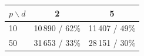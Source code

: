 \begin{tabular}{lcc}
\toprule
$p\backslash d$ & 2 & 5 \\
\midrule
10 & 10\,890 / 62\% & 11\,407 / 49\% \\
50 & 31\,653 / 33\% & 28\,151 / 30\% \\
\bottomrule
\end{tabular}